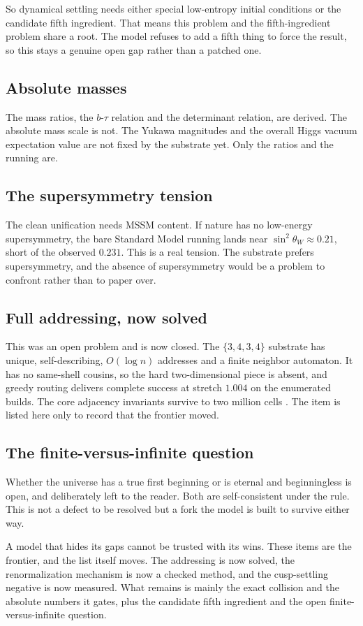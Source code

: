 So dynamical settling needs either special low-entropy initial conditions or the candidate fifth ingredient. That means this problem and the fifth-ingredient problem share a root. The model refuses to add a fifth thing to force the result, so this stays a genuine open gap rather than a patched one.

\subsection{Absolute masses}

The mass ratios, the $b$-$\tau$ relation and the determinant relation, are derived. The absolute mass scale is not. The Yukawa magnitudes and the overall Higgs vacuum expectation value are not fixed by the substrate yet. Only the ratios and the running are.

\subsection{The supersymmetry tension}

The clean unification needs MSSM content. If nature has no low-energy supersymmetry, the bare Standard Model running lands near $\sin^2\theta_W \approx 0.21$, short of the observed $0.231$. This is a real tension. The substrate prefers supersymmetry, and the absence of supersymmetry would be a problem to confront rather than to paper over.

\subsection{Full addressing, now solved}

This was an open problem and is now closed. The $\{3,4,3,4\}$ substrate has unique, self-describing, $O(\log n)$ addresses and a finite neighbor automaton. It has no same-shell cousins, so the hard two-dimensional piece is absent, and greedy routing delivers complete success at stretch $1.004$ on the enumerated builds. The core adjacency invariants survive to two million cells \cite{pollard2026vibetest}. The item is listed here only to record that the frontier moved.

\subsection{The finite-versus-infinite question}

Whether the universe has a true first beginning or is eternal and beginningless is open, and deliberately left to the reader. Both are self-consistent under the rule. This is not a defect to be resolved but a fork the model is built to survive either way.


A model that hides its gaps cannot be trusted with its wins. These items are the frontier, and the list itself moves. The addressing is now solved, the renormalization mechanism is now a checked method, and the cusp-settling negative is now measured. What remains is mainly the exact collision and the absolute numbers it gates, plus the candidate fifth ingredient and the open finite-versus-infinite question.
